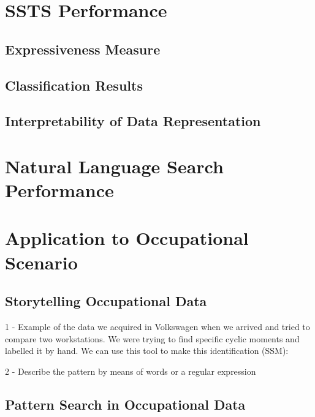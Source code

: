 \section{SSTS Performance}

\subsection{Expressiveness Measure}

\subsection{Classification Results}

\subsection{Interpretability of Data Representation}


\section{Natural Language Search Performance}



\section{Application to Occupational Scenario}
\label{cha:application_occ}


\subsection{Storytelling Occupational Data}
\label{subsec:storytel}

1 - Example of the data we acquired in Volkswagen when we arrived and tried to compare two workstations. We were trying to find specific cyclic moments and labelled it by hand. We can use this tool to make this identification (SSM):

2 - Describe the pattern by means of words or a regular expression

\subsection{Pattern Search in Occupational Data}
\label{subsec:search}


